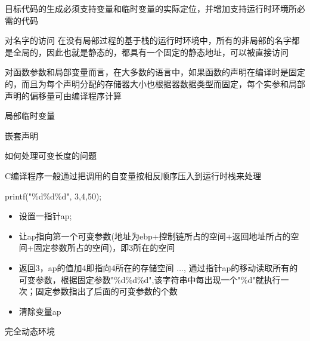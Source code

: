 \documentclass[utf8]{ctexart}
\begin{document}
目标代码的生成必须支持变量和临时变量的实际定位，并增加支持运行时环境所必需的代码

\noindent 对名字的访问
在没有局部过程的基于栈的运行时环境中，所有的非局部的名字都是全局的，因此也就是静态的，都具有一个固定的静态地址，可以被直接访问

对函数参数和局部变量而言，在大多数的语言中，如果函数的声明在编译时是固定的，而且为每个声明分配的存储器大小也根据器数据类型而固定，每个实参和局部声明的偏移量可由编译程序计算

局部临时变量

嵌套声明

如何处理可变长度的问题

C编译程序一般通过把调用的自变量按相反顺序压入到运行时栈来处理

\noindent printf("\%d\%d\%d", 3,4,50);

\begin{itemize}
    \item 设置一指针ap;
    \item 让ap指向第一个可变参数(地址为ebp+控制链所占的空间+返回地址所占的空间+固定参数所占的空间)，即3所在的空间
    \item 返回3，ap的值加4即指向4所在的存储空间 $\dots$, 通过指针ap的移动读取所有的可变参数，根据固定参数"\%d\%d\%d",该字符串中每出现一个"\%d"就执行一次；固定参数指出了后面的可变参数的个数
    \item 清除变量ap
\end{itemize}

完全动态环境
\end{document}
